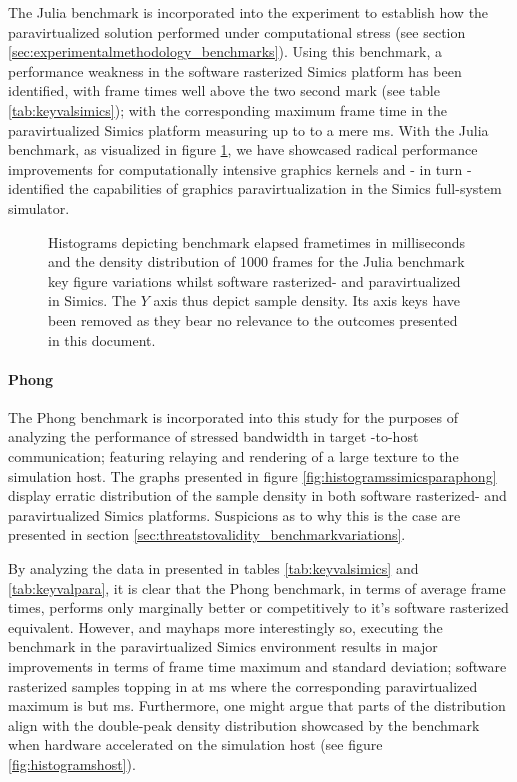 The Julia benchmark is incorporated into the experiment to establish how the paravirtualized solution performed under computational stress (see section \ref{sec:experimentalmethodology_benchmarks}).
Using this benchmark, a performance weakness in the software rasterized Simics platform has been identified, with frame times well above the two second mark (see table \ref{tab:keyvalsimics}); with the corresponding maximum frame time in the paravirtualized Simics platform measuring up to to a mere  ms.
With the Julia benchmark, as visualized in figure \ref{fig:histogramssimicsparajulia}, we have showcased radical performance improvements for computationally intensive graphics kernels and - in turn - identified the capabilities of graphics paravirtualization in the Simics full-system simulator.

\begin{figure}
  \centering
  
  \caption[Benchmark results - paravirtualized in Simics, Julia]{Histograms depicting benchmark elapsed frametimes in milliseconds and the density distribution of 1000 frames for the Julia benchmark key figure variations whilst software rasterized- and paravirtualized in Simics. The $Y$ axis thus depict sample density. Its axis keys have been removed as they bear no relevance to the outcomes presented in this document.}
  \label{fig:histogramssimicsparajulia}
\end{figure}

\paragraph{Phong}
\label{par:results_phong}
The Phong benchmark is incorporated into this study for the purposes of analyzing the performance of stressed bandwidth in target -to-host communication; featuring relaying and rendering of a large texture to the simulation host.
The graphs presented in figure \ref{fig:histogramssimicsparaphong} display erratic distribution of the sample density in both software rasterized- and paravirtualized Simics platforms.
Suspicions as to why this is the case are presented in section \ref{sec:threatstovalidity_benchmarkvariations}.

By analyzing the data in presented in tables \ref{tab:keyvalsimics} and \ref{tab:keyvalpara}, it is clear that the Phong benchmark, in terms of average frame times, performs only marginally better or competitively to it's software rasterized equivalent.
However, and mayhaps more interestingly so, executing the benchmark in the paravirtualized Simics environment results in major improvements in terms of frame time maximum and standard deviation; software rasterized samples topping in at  ms where the corresponding paravirtualized maximum is but  ms.
Furthermore, one might argue that parts of the distribution align with the double-peak density distribution showcased by the benchmark when hardware accelerated on the simulation host (see figure \ref{fig:histogramshost}).

